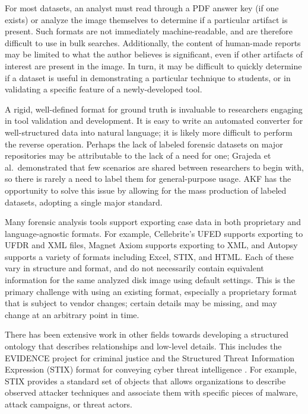 \documentclass[letterpaper,12pt]{report}
\begin{document}
For most datasets, an analyst must read through a PDF answer key (if one
exists) or analyze the image themselves to determine if a particular
artifact is present. Such formats are not immediately machine-readable,
and are therefore difficult to use in bulk searches. Additionally, the
content of human-made reports may be limited to what the author believes
is significant, even if other artifacts of interest are present in the
image. In turn, it may be difficult to quickly determine if a dataset is
useful in demonstrating a particular technique to students, or in
validating a specific feature of a newly-developed tool.

A rigid, well-defined format for ground truth is invaluable to
researchers engaging in tool validation and development. It is easy to
write an automated converter for well-structured data into natural
language; it is likely more difficult to perform the reverse operation.
Perhaps the lack of labeled forensic datasets on major repositories may
be attributable to the lack of a need for one; Grajeda et
al.~demonstrated that few scenarios are shared between researchers to
begin with, so there is rarely a need to label them for general-purpose
usage. AKF has the opportunity to solve this issue by allowing for the
mass production of labeled datasets, adopting a single major standard.

Many forensic analysis tools support exporting case data in both
proprietary and language-agnostic formats. For example, Cellebrite's
UFED supports exporting to UFDR and XML files, Magnet Axiom supports
exporting to XML, and Autopsy supports a variety of formats including
Excel, STIX, and HTML. Each of these vary in structure and format, and
do not necessarily contain equivalent information for the same analyzed
disk image using default settings. This is the primary challenge with
using an existing format, especially a proprietary format that is
subject to vendor changes; certain details may be missing, and may
change at an arbitrary point in time.

There has been extensive work in other fields towards developing a
structured ontology that describes relationships and low-level details.
This includes the EVIDENCE project for criminal justice and the
Structured Threat Information Expression (STIX) format for conveying
cyber threat intelligence
\cite{caseyLeveragingCybOXStandardize2015}. For example, STIX
provides a standard set of objects that allows organizations to describe
observed attacker techniques and associate them with specific pieces of
malware, attack campaigns, or threat actors.
\end{document}

